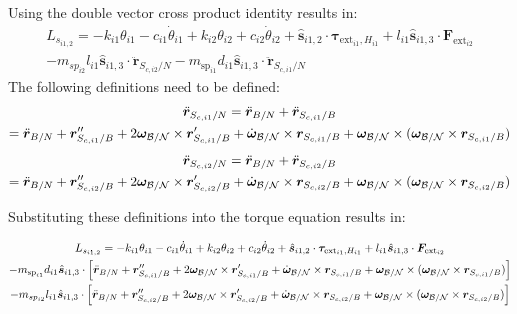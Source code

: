 \documentclass[paper]{aiaaNew}
\begin{document}
	Using the double vector cross product identity results in:
	\begin{multline}
	L_{s_{i1,2}} = - k_{i1} \theta_{i1} - c_{i1}\dot{\theta}_{i1} +  k_{i2} \theta_{i2} + c_{i2} \dot\theta_{i2} + \hat{\bm s}_{i1,2} \cdot \bm \tau_{\text{ext}_{i1},H_{i1}} + l_{i1} \hat{\bm s}_{i1,3} \cdot \bm F_{\text{ext}_{i2}} \\
	- m_{sp_{i2}} l_{i1} \hat{\bm s}_{i1,3} \cdot \ddot{\bm{r}}_{S_{c,i2}/N}
	- m_{\text{sp}_{i1}} d_{i1} \hat{\bm s}_{i1,3} \cdot  \ddot{\bm r}_{S_{c,i1}/N}
	\end{multline}
	The following definitions need to be defined:
	\begin{multline}
	\ddot{\bm r}_{S_{c,i1}/N} = \ddot{\bm{r}}_{B/N} + \ddot{\bm r}_{S_{c,i1}/B} \\ 
	= \ddot{\bm{r}}_{B/N} + \bm{r}''_{S_{c,i1}/B} + 2 \bm\omega_{\cal B/N} \times \bm{r}'_{S_{c,i1}/B} +  \dot{\bm\omega}_{\cal B/N} \times \bm{r}_{S_{c,i1}/B} + \bm\omega_{\cal B/N} \times (\bm\omega_{\cal B/N} \times \bm{r}_{S_{c,i1}/B})
	\end{multline}
	\begin{multline}
	\ddot{\bm r}_{S_{c,i2}/N} = \ddot{\bm{r}}_{B/N} + \ddot{\bm r}_{S_{c,i2}/B} \\
	= \ddot{\bm{r}}_{B/N} + \bm{r}''_{S_{c,i2}/B} + 2 \bm\omega_{\cal B/N} \times \bm{r}'_{S_{c,i2}/B} +  \dot{\bm\omega}_{\cal B/N} \times \bm{r}_{S_{c,i2}/B} + \bm\omega_{\cal B/N} \times (\bm\omega_{\cal B/N} \times \bm{r}_{S_{c,i2}/B})
	\end{multline}

	Substituting these definitions into the torque equation results in:

	
	\begin{multline}
L_{s_{i1,2}} = - k_{i1} \theta_{i1} - c_{i1}\dot{\theta}_{i1} +  k_{i2} \theta_{i2} + c_{i2} \dot\theta_{i2} + \hat{\bm s}_{i1,2} \cdot \bm \tau_{\text{ext}_{i1},H_{i1}} + l_{i1} \hat{\bm s}_{i1,3} \cdot \bm F_{\text{ext}_{i2}} \\
- m_{\text{sp}_{i1}} d_{i1} \hat{\bm s}_{i1,3} \cdot \Big[\ddot{\bm{r}}_{B/N} + \bm{r}''_{S_{c,i1}/B} + 2 \bm\omega_{\cal B/N} \times \bm{r}'_{S_{c,i1}/B} +  \dot{\bm\omega}_{\cal B/N} \times \bm{r}_{S_{c,i1}/B}
 + \bm\omega_{\cal B/N} \times (\bm\omega_{\cal B/N} \times \bm{r}_{S_{c,i1}/B})\Big]\\
 - m_{sp_{i2}} l_{i1} \hat{\bm s}_{i1,3} \cdot \Big[\ddot{\bm{r}}_{B/N} + \bm{r}''_{S_{c,i2}/B} + 2 \bm\omega_{\cal B/N} \times \bm{r}'_{S_{c,i2}/B} +  \dot{\bm\omega}_{\cal B/N} \times \bm{r}_{S_{c,i2}/B} + \bm\omega_{\cal B/N} \times (\bm\omega_{\cal B/N} \times \bm{r}_{S_{c,i2}/B})\Big]
\end{multline}
\end{document}
